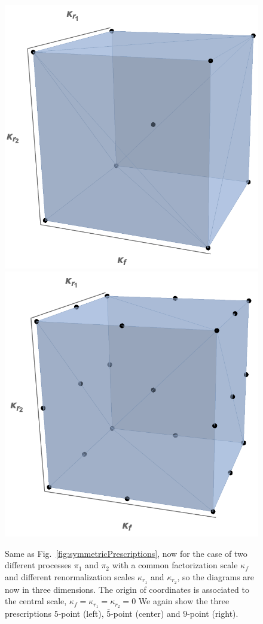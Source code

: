 \begin{figure}[t]
\includegraphics[scale=0.39]{mhous/plots//5barpt_3D.png}
\includegraphics[scale=0.39]{mhous/plots//9pt_3D.png}
\begin{caption}{\small Same as Fig.~\ref{fig:symmetricPrescriptions}, now
    for the case of two different processes $\pi_1$ and $\pi_2$
    with a common factorization scale $\kappa_f$ and different renormalization scales $\kappa_{r_1}$
    and $\kappa_{r_2}$, so the diagrams are now in three dimensions. The origin 
of coordinates is associated to the central scale, $\kappa_f=\kappa_{r_1}=\kappa_{r_2}=0$
    We again show the three prescriptions $5$-point (left), $\bar{5}$-point (center) and $9$-point (right).}
  \label{fig:symmetricPrescriptions2proc}
\end{caption}
\end{figure}
